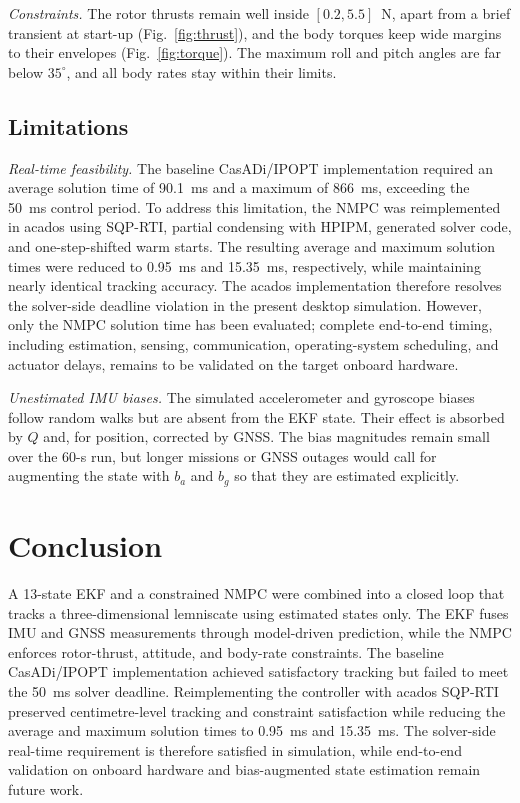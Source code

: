 \documentclass[conference]{IEEEtran}
\begin{document}
\textit{Constraints.} The rotor thrusts remain well inside $[0.2,5.5]$~N, apart from a brief transient at start-up (Fig.~\ref{fig:thrust}), and the body torques keep wide margins to their envelopes (Fig.~\ref{fig:torque}). The maximum roll and pitch angles are far below $35^\circ$, and all body rates stay within their limits.

\subsection{Limitations}
\textit{Real-time feasibility.} The baseline CasADi/IPOPT implementation required an average solution time of \SI{90.1}{ms} and a maximum of \SI{866}{ms}, exceeding the \SI{50}{ms} control period. To address this limitation, the NMPC was reimplemented in acados using SQP-RTI, partial condensing with HPIPM, generated solver code, and one-step-shifted warm starts. The resulting average and maximum solution times were reduced to \SI{0.95}{ms} and \SI{15.35}{ms}, respectively, while maintaining nearly identical tracking accuracy. The acados implementation therefore resolves the solver-side deadline violation in the present desktop simulation. However, only the NMPC solution time has been evaluated; complete end-to-end timing, including estimation, sensing, communication, operating-system scheduling, and actuator delays, remains to be validated on the target onboard hardware.

\textit{Unestimated IMU biases.} The simulated accelerometer and gyroscope biases follow random walks but are absent from the EKF state. Their effect is absorbed by $Q$ and, for position, corrected by GNSS. The bias magnitudes remain small over the 60-s run, but longer missions or GNSS outages would call for augmenting the state with $b_a$ and $b_g$ so that they are estimated explicitly.

\section{Conclusion}
A 13-state EKF and a constrained NMPC were combined into a closed loop that tracks a three-dimensional lemniscate using estimated states only. The EKF fuses IMU and GNSS measurements through model-driven prediction, while the NMPC enforces rotor-thrust, attitude, and body-rate constraints. The baseline CasADi/IPOPT implementation achieved satisfactory tracking but failed to meet the \SI{50}{ms} solver deadline. Reimplementing the controller with acados SQP-RTI preserved centimetre-level tracking and constraint satisfaction while reducing the average and maximum solution times to \SI{0.95}{ms} and \SI{15.35}{ms}. The solver-side real-time requirement is therefore satisfied in simulation, while end-to-end validation on onboard hardware and bias-augmented state estimation remain future work.
\end{document}
